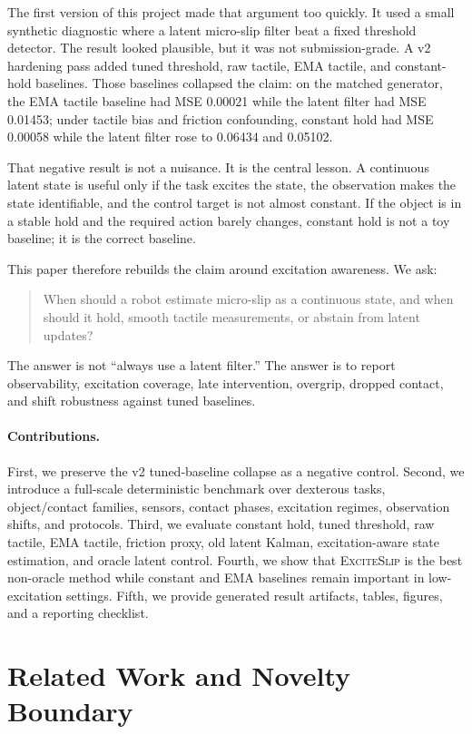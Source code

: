 \documentclass{article}
\newcommand{\method}{\textsc{ExciteSlip}\xspace}
\begin{document}
The first version of this project made that argument too quickly. It used a small synthetic diagnostic where a latent micro-slip filter beat a fixed threshold detector. The result looked plausible, but it was not submission-grade. A v2 hardening pass added tuned threshold, raw tactile, EMA tactile, and constant-hold baselines. Those baselines collapsed the claim: on the matched generator, the EMA tactile baseline had MSE 0.00021 while the latent filter had MSE 0.01453; under tactile bias and friction confounding, constant hold had MSE 0.00058 while the latent filter rose to 0.06434 and 0.05102.

That negative result is not a nuisance. It is the central lesson. A continuous latent state is useful only if the task excites the state, the observation makes the state identifiable, and the control target is not almost constant. If the object is in a stable hold and the required action barely changes, constant hold is not a toy baseline; it is the correct baseline.

This paper therefore rebuilds the claim around excitation awareness. We ask:
\begin{quote}
When should a robot estimate micro-slip as a continuous state, and when should it hold, smooth tactile measurements, or abstain from latent updates?
\end{quote}
The answer is not ``always use a latent filter.'' The answer is to report observability, excitation coverage, late intervention, overgrip, dropped contact, and shift robustness against tuned baselines.

\paragraph{Contributions.}
First, we preserve the v2 tuned-baseline collapse as a negative control. Second, we introduce a full-scale deterministic benchmark over dexterous tasks, object/contact families, sensors, contact phases, excitation regimes, observation shifts, and protocols. Third, we evaluate constant hold, tuned threshold, raw tactile, EMA tactile, friction proxy, old latent Kalman, excitation-aware state estimation, and oracle latent control. Fourth, we show that \method is the best non-oracle method while constant and EMA baselines remain important in low-excitation settings. Fifth, we provide generated result artifacts, tables, figures, and a reporting checklist.

\section{Related Work and Novelty Boundary}
\end{document}
